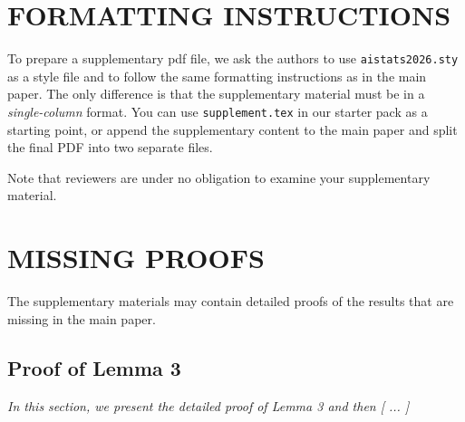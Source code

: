\documentclass[twoside]{article}
\begin{document}
%

%

\onecolumn
{}

\section{FORMATTING INSTRUCTIONS}

To prepare a supplementary pdf file, we ask the authors to use \texttt{aistats2026.sty} as a style file and to follow the same formatting instructions as in the main paper.
The only difference is that the supplementary material must be in a \emph{single-column} format.
You can use \texttt{supplement.tex} in our starter pack as a starting point, or append the supplementary content to the main paper and split the final PDF into two separate files.

Note that reviewers are under no obligation to examine your supplementary material.

\section{MISSING PROOFS}

The supplementary materials may contain detailed proofs of the results that are missing in the main paper.

\subsection{Proof of Lemma 3}

\textit{In this section, we present the detailed proof of Lemma 3 and then [ ... ]}
\end{document}
